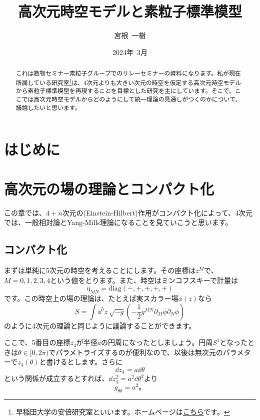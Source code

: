 \documentclass[unicode,a4paper,10pt]{ltjsarticle}
\title{高次元時空モデルと素粒子標準模型}
\author{宮根\ 一樹}
\date{2024年\ 3月}
\begin{document}
\maketitle

\begin{abstract}
   これは数物セミナー素粒子グループでのリレーセミナーの資料になります。私が現在所属している研究室\footnote{
      早稲田大学の安倍研究室といいます。ホームページは\href{http://www.hep.phys.waseda.ac.jp/index-j.html}{こちら}です。
   }は、4次元よりも大きい次元の時空を仮定する高次元時空モデルから素粒子標準模型を再現することを目標とした研究を主にしています。そこで、ここでは高次元時空モデルからどのようにして統一理論の見通しがつくのかについて、議論したいと思います。
\end{abstract}

\tableofcontents

\clearpage

\section{はじめに}


\clearpage

\section{高次元の場の理論とコンパクト化}

この章では、$4+n$次元の(Einstein-Hilbert)作用がコンパクト化によって、4次元では、一般相対論とYang-Mills理論になることを見ていこうと思います。


\subsection{コンパクト化}

まずは単純に5次元の時空を考えることにします。その座標は$z^{M}$で、$M=0,1,2,3,4$という値をとります。また、時空はミンコフスキーで計量は
\begin{equation}
   \eta_{MN}
   =
   \text{diag}(-,+,+,+,+)
\end{equation}
です。この時空上の場の理論は、たとえば実スカラー場$\phi(z)$なら
\begin{equation}
   S
   =
   \int\dd^5 z\ \sqrt{-g}
   \left(  
      -\frac{1}{2}
      g^{MN}\partial_{M}\phi\partial_{N}\phi
   \right)
   \label{eqn:action_5d_real_scalar}
\end{equation}
のように4次元の理論と同じように議論することができます。

ここで、5番目の座標$z_{4}$が半径$a$の円周になったとしましょう。円周$S^{1}$となったときは$\theta\in[0,2\pi)$でパラメトライズするのが便利なので、以後は無次元のパラメターで$z_{4}(\theta)$と書けるとします。さらに
\begin{equation}
   \dd z_{4}
   =
   a\dd \theta
\end{equation}
という関係が成立するとすれば、$\dd z_{4}^2=a^2\dd \theta^2$より
\begin{equation}
   g_{\theta\theta}=a^2
   。
\end{equation}
\end{document}
